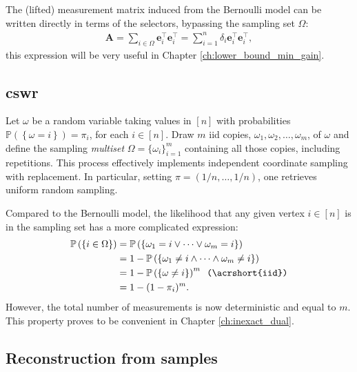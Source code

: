The (lifted) measurement matrix induced from the Bernoulli model can be written directly in terms of the selectors, bypassing the sampling set $\Omega$:
\begin{align}
    \mathbf{A} = \sum_{i \in \Omega} \mathbf{e}_i^\top \mathbf{e}_i^\top = \sum_{i=1}^n \delta_i \mathbf{e}_i^\top \mathbf{e}_i^\top,
\end{align}
this expression will be very useful in Chapter \ref{ch:lower_bound_min_gain}.


\subsection{\texorpdfstring{\acrfull{cswr}}{Coordinate Sampling with Replacement}}\label{sec:cswr}

Let $\omega$ be a random variable taking values in $[n]$ with probabilities $\mathbb{P} \left ( \left \{ \omega = i \right \}\right ) = \pi_i$, for each $i \in [n]$. Draw $m$ \acrshort{iid} copies, $\omega_1, \omega_2, \dots, \omega_m$, of $\omega$ and define the sampling \emph{multiset} $\Omega = \{ \omega_i \}_{i=1}^m$ containing all those copies, including repetitions. This process effectively implements independent coordinate sampling with replacement. In particular, setting $\pi = (1/n, \dots, 1/n)$, one retrieves uniform random sampling.

Compared to the Bernoulli model, the likelihood that any given vertex $i \in [n]$ is in the sampling set has a more complicated expression:
\begin{align*}
    \mathbb{P} \left ( \left \{ i \in \Omega \right \}\right ) & = \mathbb{P} \left ( \left \{  \omega_1 = i \vee \dots \vee \omega_m = i \right \}\right ) \\
    & = 1 - \mathbb{P} \left ( \left \{  \omega_1 \neq i \wedge \dots \wedge \omega_m \neq i \right \}\right ) \\
    & = 1 - \mathbb{P} \left ( \left \{ \omega \neq i \right \}\right )^m \enspace \comment{\acrshort{iid}}\\
    & = 1 - (1 - \pi_i)^m.
\end{align*}
However, the total number of measurements is now deterministic and equal to $m$. This property proves to be convenient in Chapter \ref{ch:inexact_dual}.


\subsection{Reconstruction from samples}


